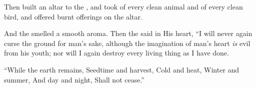 
\bverse Then  built an altar to the \lord, and took of every clean animal and of every clean bird, and offered burnt offerings on the altar.

\bverse And the \lord smelled a smooth aroma. Then the \lord said in His heart, ``I will never again curse the ground for man's sake, although the imagination of man's heart \textit{is} evil from his youth; nor will I again destroy every living thing as I have done.

\begin{bquotation}
\bverse ``While the earth remains, Seedtime and harvest, Cold and heat, Winter and summer, And day and night, Shall not cease.''
\end{bquotation}
